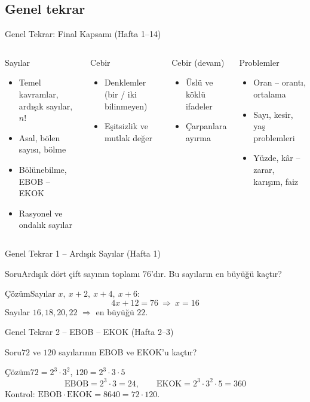 \documentclass[aspectratio=169,11pt]{beamer}
\newcommand{\soru}[3]{%
\begin{frame}{#1}
  \begin{block}{Soru}\large #2\end{block}
  \pause
  \begin{exampleblock}{Çözüm}\large #3\end{exampleblock}
\end{frame}}
\begin{document}
\subsection{Genel tekrar}
\begin{frame}{Genel Tekrar: Final Kapsamı (Hafta 1--14)}
\begin{columns}[t]
\begin{block}{Sayılar}
\begin{itemize}
\item Temel kavramlar, ardışık sayılar, \(n!\)
\item Asal, bölen sayısı, bölme
\item Bölünebilme, EBOB -- EKOK
\item Rasyonel ve ondalık sayılar
\end{itemize}
\end{block}
\begin{block}{Cebir}
\begin{itemize}
\item Denklemler (bir / iki bilinmeyen)
\item Eşitsizlik ve mutlak değer
\end{itemize}
\end{block}
\begin{block}{Cebir (devam)}
\begin{itemize}
\item Üslü ve köklü ifadeler
\item Çarpanlara ayırma
\end{itemize}
\end{block}
\begin{block}{Problemler}
\begin{itemize}
\item Oran -- orantı, ortalama
\item Sayı, kesir, yaş problemleri
\item Yüzde, kâr -- zarar, karışım, faiz
\end{itemize}
\end{block}
\end{columns}
\end{frame}

\soru{Genel Tekrar 1 -- Ardışık Sayılar (Hafta 1)}
{Ardışık dört çift sayının toplamı \(76\)'dır. Bu sayıların en büyüğü kaçtır?}
{Sayılar \(x,\ x+2,\ x+4,\ x+6\):
\[4x+12=76\ \Rightarrow\ x=16\]
Sayılar \(16,18,20,22\) \(\Rightarrow\) en büyüğü \(22\).}

\soru{Genel Tekrar 2 -- EBOB -- EKOK (Hafta 2--3)}
{\(72\) ve \(120\) sayılarının EBOB ve EKOK'u kaçtır?}
{\(72=2^3\cdot 3^2\), \qquad \(120=2^3\cdot 3\cdot 5\)
\[\text{EBOB}=2^3\cdot 3=24,\qquad \text{EKOK}=2^3\cdot 3^2\cdot 5=360\]
Kontrol: \(\text{EBOB}\cdot\text{EKOK}=8640=72\cdot 120\).}
\end{document}
